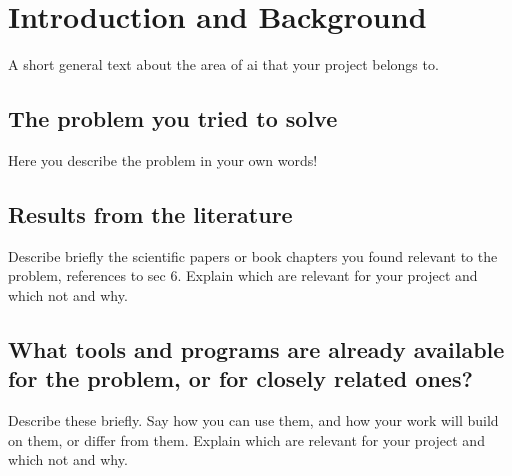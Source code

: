 \chapter{Introduction and Background}
A short general text about the area of ai that your project belongs to.


\section{The problem you tried to solve}
Here you describe the problem in your own words!


\section{Results from the literature}
Describe briefly the scientific papers or book chapters you found relevant to the problem, references to sec 6. Explain which are relevant for your project and which not and why.


\section{What tools and programs are already available for the problem, or for closely related ones?}
Describe these briefly. Say how you can use them, and how your work will build on them, or differ from them. Explain which are relevant for your project and which not and why.

